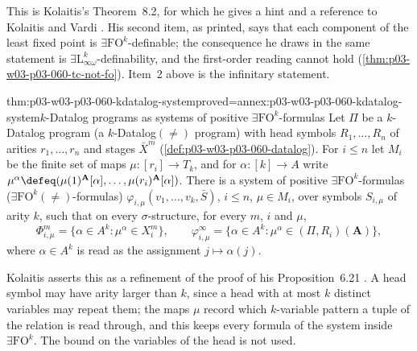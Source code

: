This is Kolaitis's Theorem~8.2, for which he gives a hint and a reference
to Kolaitis and Vardi \cite[Thm.~8.2, p.~70]{Kolaitis2003ExpressivePowerNotes}.
His second item, as printed, says that each component of the least fixed
point is \(\exists\mathrm{FO}^k\)-definable; the consequence he draws in the
same statement is \(\exists\mathrm{L}^k_{\infty\omega}\)-definability, and
the first-order reading cannot hold
(\cref{thm:p03-w03-p03-060-tc-not-fo}). Item~2 above is the infinitary
statement.

\begin{hbtheorem}{thm:p03-w03-p03-060-kdatalog-system}{proved=annex:p03-w03-p03-060-kdatalog-system}{\(k\)-Datalog programs as systems of positive \(\exists\mathrm{FO}^k\)-formulas}
Let \(\Pi\) be a \(k\)-Datalog program (a \(k\)-Datalog\((\neq)\) program)
with head symbols \(R_1,\ldots,R_n\) of arities \(r_1,\ldots,r_n\) and
stages \(\bar X^m\) (\cref{def:p03-w03-p03-060-datalog}). For \(i\le n\) let
\(M_i\) be the finite set of maps \(\mu\colon[r_i]\to T_k\), and for
\(\alpha\colon[k]\to A\) write
\(\mu^\alpha\defeq(\mu(1)^{\mathbf A}[\alpha],\ldots,\mu(r_i)^{\mathbf A}[\alpha])\).
There is a system of positive \(\exists\mathrm{FO}^k\)-formulas
(\(\exists\mathrm{FO}^k(\neq)\)-formulas)
\(\varphi_{i,\mu}(v_1,\ldots,v_k,\bar S)\), \(i\le n\), \(\mu\in M_i\), over
symbols \(S_{i,\mu}\) of arity \(k\), such that on every
\(\sigma\)-structure, for every \(m\), \(i\) and \(\mu\),
\[
 \Phi^m_{i,\mu}=\{\alpha\in A^k:\mu^\alpha\in X^m_i\},\qquad
 \varphi^\infty_{i,\mu}=\{\alpha\in A^k:\mu^\alpha\in(\Pi,R_i)(\mathbf A)\},
\]
where \(\alpha\in A^k\) is read as the assignment \(j\mapsto\alpha(j)\).
\end{hbtheorem}

Kolaitis asserts this as a refinement of the proof of his
Proposition~6.21 \cite[p.~71]{Kolaitis2003ExpressivePowerNotes}. A head
symbol may have arity larger than \(k\), since a head with at most \(k\)
distinct variables may repeat them; the maps \(\mu\) record which
\(k\)-variable pattern a tuple of the relation is read through, and this
keeps every formula of the system inside \(\exists\mathrm{FO}^k\). The
bound on the variables of the head is not used.

